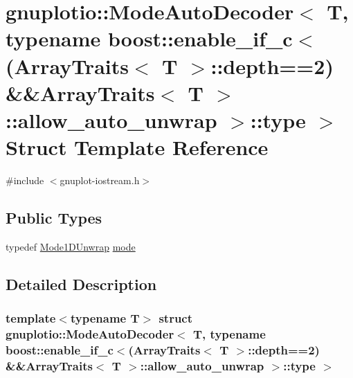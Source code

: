 \hypertarget{structgnuplotio_1_1_mode_auto_decoder_3_01_t_00_01typename_01boost_1_1enable__if__c_3_07_array_t4ce8ac95d6c3a0ceeea993ff675b3872}{}\section{gnuplotio\+:\+:Mode\+Auto\+Decoder$<$ T, typename boost\+:\+:enable\+\_\+if\+\_\+c$<$(Array\+Traits$<$ T $>$\+:\+:depth==2) \&\&Array\+Traits$<$ T $>$\+:\+:allow\+\_\+auto\+\_\+unwrap $>$\+:\+:type $>$ Struct Template Reference}
\label{structgnuplotio_1_1_mode_auto_decoder_3_01_t_00_01typename_01boost_1_1enable__if__c_3_07_array_t4ce8ac95d6c3a0ceeea993ff675b3872}


{\ttfamily \#include $<$gnuplot-\/iostream.\+h$>$}

\subsection*{Public Types}
\begin{DoxyCompactItemize}
\item 
typedef \hyperlink{structgnuplotio_1_1_mode1_d_unwrap}{Mode1\+D\+Unwrap} \hyperlink{structgnuplotio_1_1_mode_auto_decoder_3_01_t_00_01typename_01boost_1_1enable__if__c_3_07_array_t4ce8ac95d6c3a0ceeea993ff675b3872_a9e0be01a3f2d3ea2184dab631c3bb950}{mode}
\end{DoxyCompactItemize}


\subsection{Detailed Description}
\subsubsection*{template$<$typename T$>$\newline
struct gnuplotio\+::\+Mode\+Auto\+Decoder$<$ T, typename boost\+::enable\+\_\+if\+\_\+c$<$(\+Array\+Traits$<$ T $>$\+::depth==2) \&\&\+Array\+Traits$<$ T $>$\+::allow\+\_\+auto\+\_\+unwrap $>$\+::type $>$}



